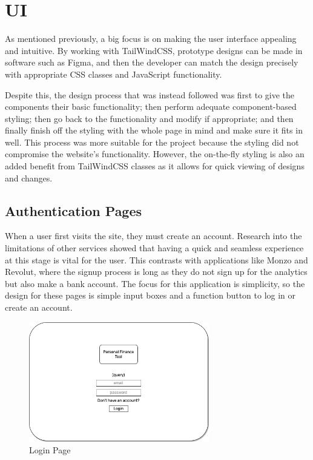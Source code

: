 \section{UI}
\label{sec:ui}
As mentioned previously, a big focus is on making the user interface appealing and intuitive. By working with TailWindCSS, prototype designs can be made in software such as Figma, and then the developer can match the design precisely with appropriate CSS classes and JavaScript functionality.

Despite this, the design process that was instead followed was first to give the components their basic functionality; then perform adequate component-based styling; then go back to the functionality and modify if appropriate; and then finally finish off the styling with the whole page in mind and make sure it fits in well. This process was more suitable for the project because the styling did not compromise the website's functionality. However, the on-the-fly styling is also an added benefit from TailWindCSS classes as it allows for quick viewing of designs and changes.

\subsection{Authentication Pages}
When a user first visits the site, they must create an account. Research into the limitations of other services showed that having a quick and seamless experience at this stage is vital for the user. This contrasts with applications like Monzo and Revolut, where the signup process is long as they do not sign up for the analytics but also make a bank account. The focus for this application is simplicity, so the design for these pages is simple input boxes and a function button to log in or create an account.

\begin{figure}[H]
	\centering
	\includegraphics[width=0.7\textwidth]{images/Login_specification.png}
	\caption{Login Page}
	\label{fig:LoginPage}
\end{figure}

